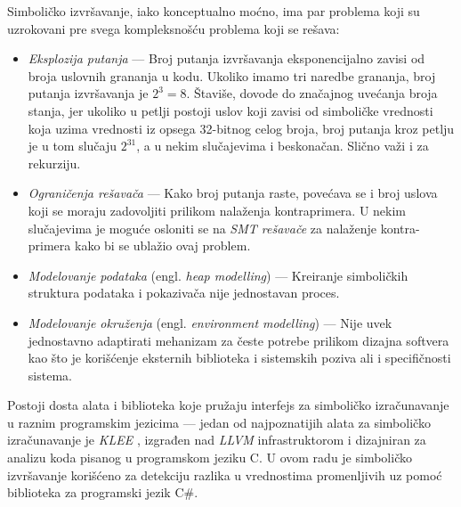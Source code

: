 Simboličko izvršavanje, iako konceptualno moćno, ima par problema koji su uzrokovani pre svega kompleksnošću problema koji se rešava:
\begin{itemize}
    \item \emph{Eksplozija putanja} --- Broj putanja izvršavanja eksponencijalno zavisi od broja uslovnih grananja u kodu. Ukoliko imamo tri naredbe grananja, broj putanja izvršavanja je $2^3=8$. Štaviše, dovode do značajnog uvećanja broja stanja, jer ukoliko u petlji postoji uslov koji zavisi od simboličke vrednosti koja uzima vrednosti iz opsega 32-bitnog celog broja, broj putanja kroz petlju je u tom slučaju $2^{31}$, a u nekim slučajevima i beskonačan. Slično važi i za rekurziju.
    \item \emph{Ograničenja rešavača} --- Kako broj putanja raste, povećava se i broj uslova koji se moraju zadovoljiti prilikom nalaženja kontraprimera. U nekim slučajevima je moguće osloniti se na \emph{SMT rešavače} \cite{SMT} za nalaženje kontra-primera kako bi se ublažio ovaj problem.
    \item \emph{Modelovanje podataka} (engl. \emph{heap modelling}) --- Kreiranje simboličkih struktura podataka i pokazivača nije jednostavan proces.
    \item \emph{Modelovanje okruženja} (engl. \emph{environment modelling}) --- Nije uvek jednostavno adaptirati mehanizam za česte potrebe prilikom dizajna softvera kao što je korišćenje eksternih biblioteka i sistemskih poziva ali i specifičnosti sistema.
\end{itemize}

Postoji dosta alata i biblioteka koje pružaju interfejs za simboličko izračunavanje u raznim programskim jezicima --- jedan od najpoznatijih alata za simboličko izračunavanje je \emph{KLEE} \cite{KLEE}, izgrađen nad \emph{LLVM} infrastruktorom \cite{LLVM} i dizajniran za analizu koda pisanog u programskom jeziku C. U ovom radu je simboličko izvršavanje korišćeno za detekciju razlika u vrednostima promenljivih uz pomoć biblioteka za programski jezik C\#.
